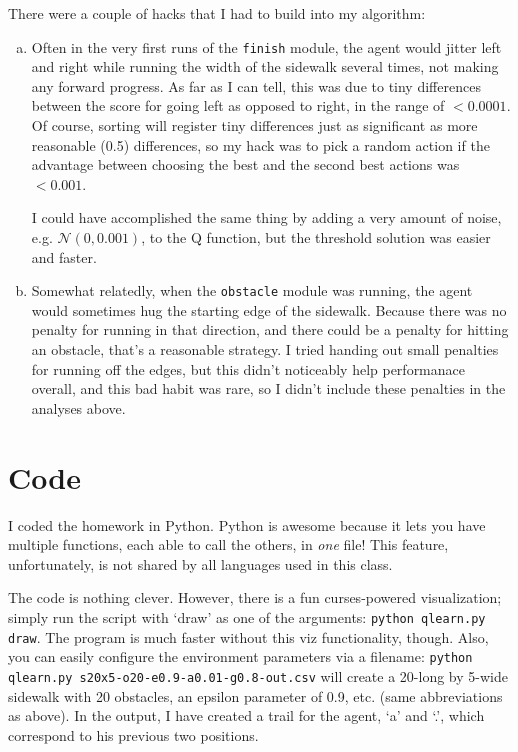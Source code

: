 \documentclass[11pt]{report}
\begin{document}
There were a couple of hacks that I had to build into my algorithm:
\begin{enumerate}[a.]
  \item Often in the very first runs of the \texttt{finish} module, the agent would jitter left and right while running the width of the sidewalk several times, not making any forward progress. As far as I can tell, this was due to tiny differences between the score for going left as opposed to right, in the range of $< 0.0001$. Of course, sorting will register tiny differences just as significant as more reasonable (0.5) differences, so my hack was to pick a random action if the advantage between choosing the best and the second best actions was $< 0.001$.

  I could have accomplished the same thing by adding a very amount of noise, e.g. $\mathcal{N}(0, 0.001)$, to the Q function, but the threshold solution was easier and faster.

  \item Somewhat relatedly, when the \texttt{obstacle} module was running, the agent would sometimes hug the starting edge of the sidewalk. Because there was no penalty for running in that direction, and there could be a penalty for hitting an obstacle, that's a reasonable strategy. I tried handing out small penalties for running off the edges, but this didn't noticeably help performanace overall, and this bad habit was rare, so I didn't include these penalties in the analyses above.
\end{enumerate}

\section{Code}

I coded the homework in Python. Python is awesome because it lets you have multiple functions, each able to call the others, in \emph{one} file! This feature, unfortunately, is not shared by all languages used in this class.

The code is nothing clever. However, there is a fun curses-powered visualization; simply run the script with `draw' as one of the arguments: \texttt{python qlearn.py draw}. The program is much faster without this viz functionality, though. Also, you can easily configure the environment parameters via a filename: \texttt{python qlearn.py s20x5-o20-e0.9-a0.01-g0.8-out.csv} will create a 20-long by 5-wide sidewalk with 20 obstacles, an epsilon parameter of 0.9, etc. (same abbreviations as above).
In the output, I have created a trail for the agent, `a' and `.', which correspond to his previous two positions.
\end{document}
